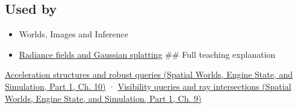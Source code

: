 \subsection{Used by}\label{appendix-0b426c47dd78-used-by}

\hypertarget{appendix-0b426c47dd78-used-by}{}

\begin{itemize}
\item
  {Worlds, Images and Inference}
\item
  \hyperref[appendix-c5b332e400e7]{Radiance fields and Gaussian splatting} \#\# Full teaching explanation
\end{itemize}

\href{../05-Spatial-Worlds-Engine-State-and-Simulation-P01/main.pdf\#04-visual-computing-ii-ch029-acceleration-structures-and-robust-queries-1}{Acceleration structures and robust queries (Spatial Worlds, Engine State, and Simulation, Part 1, Ch. 10)} · \href{../05-Spatial-Worlds-Engine-State-and-Simulation-P01/main.pdf\#04-visual-computing-ii-ch028-visibility-queries-and-ray-intersections-1}{Visibility queries and ray intersections (Spatial Worlds, Engine State, and Simulation, Part 1, Ch. 9)}
